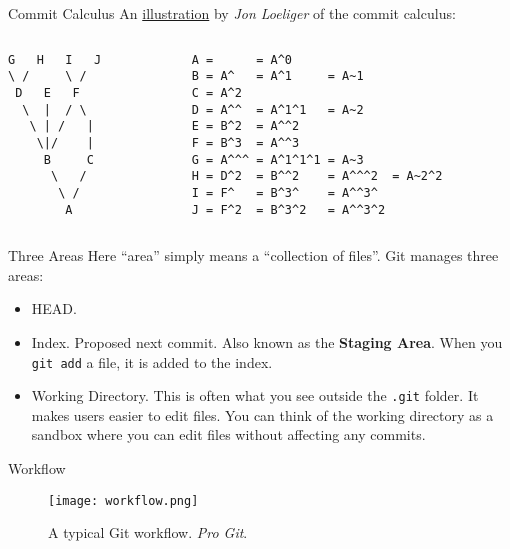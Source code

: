 \documentclass[aspectratio=169]{beamer}
\begin{document}
\begin{frame}[fragile]{Commit Calculus}
    An \href{https://mirrors.edge.kernel.org/pub/software/scm/git/docs/git-rev-parse.html}{illustration} by \emph{Jon Loeliger} of the commit calculus:
    \bigskip
    \begin{columns}
        \begin{column}{0.2\textwidth}
            \begin{verbatim}
G   H   I   J
\ /     \ /
 D   E   F
  \  |  / \
   \ | /   |
    \|/    |
     B     C
      \   /
       \ /
        A
            \end{verbatim}
        \end{column}
        \begin{column}{0.5\textwidth}
            \begin{verbatim}
A =      = A^0
B = A^   = A^1     = A~1
C = A^2
D = A^^  = A^1^1   = A~2
E = B^2  = A^^2
F = B^3  = A^^3
G = A^^^ = A^1^1^1 = A~3
H = D^2  = B^^2    = A^^^2  = A~2^2
I = F^   = B^3^    = A^^3^
J = F^2  = B^3^2   = A^^3^2
            \end{verbatim}
        \end{column}
    \end{columns}
\end{frame}

\begin{frame}{Three Areas}
    Here ``area'' simply means a ``collection of files''.
    Git manages three areas:
    \begin{itemize}
        \item HEAD.
        \item Index. Proposed next commit. Also known as the \textbf{Staging Area}. When you \texttt{git add} a file, it is added to the index.
        \item Working Directory. This is often what you see outside the \texttt{.git} folder. It makes users easier to edit files. You can think of the working directory as a sandbox where you can edit files without affecting any commits.
    \end{itemize}
\end{frame}

\begin{frame}{Workflow}
    \begin{figure}
        \centering
        \texttt{[image: workflow.png]}
        \caption{A typical Git workflow. \emph{Pro Git}.}
    \end{figure}
\end{frame}
\end{document}
